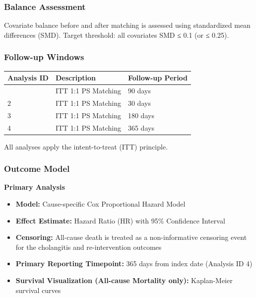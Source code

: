 \documentclass[
  12pt,
]{article}
\providecommand{\tightlist}{%
  \setlength{\itemsep}{0pt}\setlength{\parskip}{0pt}}
\begin{document}
\subsubsection{Balance Assessment}\label{balance-assessment}

Covariate balance before and after matching is assessed using standardized mean differences (SMD). Target threshold: all covariates SMD ≤ 0.1 (or ≤ 0.25).

\subsubsection{Follow-up Windows}\label{follow-up-windows}

\begin{longtable}[]{@{}lll@{}}
\toprule\noalign{}
Analysis ID & Description & Follow-up Period \\
\midrule\noalign{}
\endhead
\bottomrule\noalign{}
\endlastfoot
1 & ITT 1:1 PS Matching & 90 days \\
2 & ITT 1:1 PS Matching & 30 days \\
3 & ITT 1:1 PS Matching & 180 days \\
4 & ITT 1:1 PS Matching & 365 days \\
\end{longtable}

All analyses apply the intent-to-treat (ITT) principle.

\subsubsection{Outcome Model}\label{outcome-model}

\textbf{Primary Analysis}

\begin{itemize}
\tightlist
\item
  \textbf{Model:} Cause-specific Cox Proportional Hazard Model
\item
  \textbf{Effect Estimate:} Hazard Ratio (HR) with 95\% Confidence Interval
\item
  \textbf{Censoring:} All-cause death is treated as a non-informative censoring event
  for the cholangitis and re-intervention outcomes
\item
  \textbf{Primary Reporting Timepoint:} 365 days from index date (Analysis ID 4)
\item
  \textbf{Survival Visualization (All-cause Mortality only):} Kaplan-Meier survival curves
\end{itemize}
\end{document}
